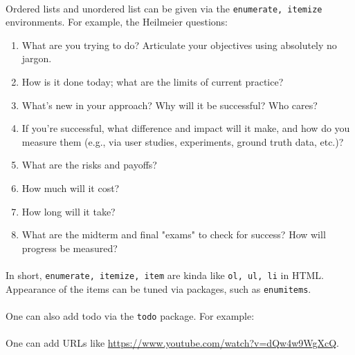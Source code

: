 \paragraph{}Ordered lists and unordered list can be given via the \texttt{enumerate, itemize} environments. For example, the Heilmeier questions:
\begin{enumerate}[label=(\arabic*)]
    \item What are you trying to do? Articulate your objectives using absolutely no jargon.
    \item How is it done today; what are the limits of current practice?
    \item What's new in your approach? Why will it be successful?
    Who cares?
    \item If you're successful, what difference and impact will it make, and how do you measure them (e.g., via user studies, experiments, ground truth data, etc.)?
    \item What are the risks and payoffs?
    \item How much will it cost?
    \item How long will it take?
    \item What are the midterm and final "exams" to check for success? How will progress be measured?
\end{enumerate}
\paragraph{}In short, \texttt{enumerate, itemize, item} are kinda like \texttt{ol, ul, li} in HTML. Appearance of the items can be tuned via packages, such as \texttt{enumitems}.
\paragraph{}One can also add todo via the \texttt{todo} package. For example: 
\paragraph{}One can add URLs like \url{https://www.youtube.com/watch?v=dQw4w9WgXcQ}.
